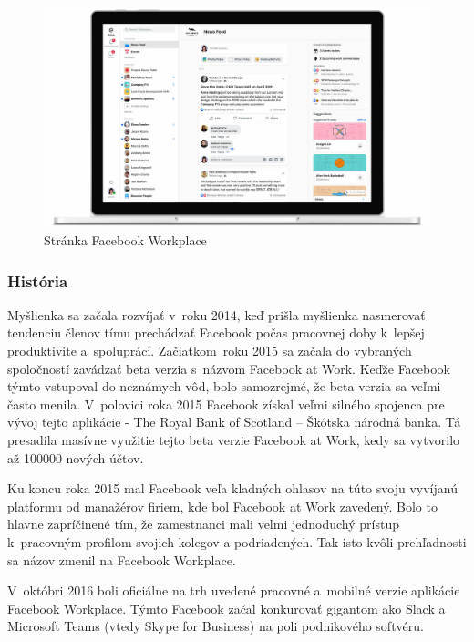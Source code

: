 \begin{figure}[H]
    \centering
    \includegraphics[scale=0.25]{img/obr-fb-workplace.jpg}
    \caption{Stránka Facebook Workplace}
    \label{fig:img-fb-workplace}
\end{figure}

\subsubsection{História}
\indent Myšlienka sa začala rozvíjať v roku 2014, keď prišla myšlienka nasmerovať tendenciu členov tímu prechádzať Facebook počas pracovnej doby k lepšej produktivite a spolupráci. Začiatkom roku 2015 sa začala do vybraných spoločností zavádzať beta verzia s názvom Facebook at Work. Keďže Facebook týmto vstupoval do neznámych vôd, bolo samozrejmé, že beta verzia sa veľmi často menila. V polovici roka 2015 Facebook získal veľmi silného spojenca pre vývoj tejto aplikácie - The Royal Bank of Scotland – Škótska národná banka. Tá presadila masívne využitie tejto beta verzie Facebook at Work, kedy sa vytvorilo až 100000 nových účtov. 

\indent Ku koncu roka 2015 mal Facebook veľa kladných ohlasov na túto svoju vyvíjanú platformu od manažérov firiem, kde bol Facebook at Work zavedený. Bolo to hlavne zapríčinené tím, že zamestnanci mali veľmi jednoduchý prístup k pracovným profilom svojich kolegov a podriadených. Tak isto kvôli prehľadnosti sa názov zmenil na Facebook Workplace.

\indent  V októbri 2016 boli oficiálne na trh uvedené pracovné a mobilné verzie aplikácie Facebook Workplace. Týmto Facebook začal konkurovať gigantom ako Slack a Microsoft Teams (vtedy Skype for Business) na poli podnikového softvéru.
